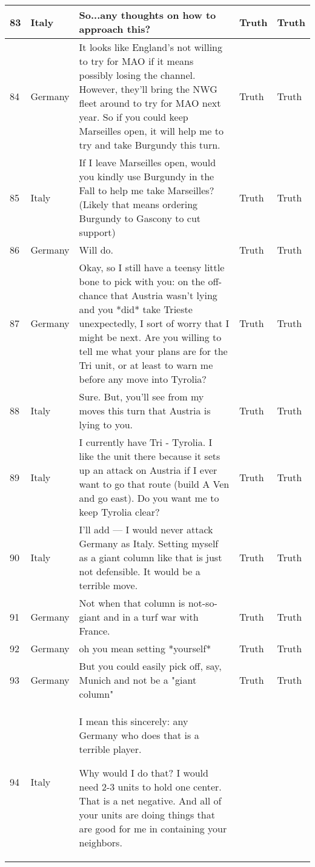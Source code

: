 \begin{longtable}{p{.3 cm} p{1.25cm} p{8.25cm} p{1.1cm} p{1.1cm}}
		\hline
		83 & Italy & So...any thoughts on how to approach this? & Truth & Truth \\
		\hline
		84 & Germany & It looks like England's not willing to try for MAO if it means possibly losing the channel. However, they'll bring the NWG fleet around to try for MAO next year. 
		So if you could keep Marseilles open, it will help me to try and take Burgundy this turn. & Truth & Truth \\
		\hline
		85 & Italy & If I leave Marseilles open, would you kindly use Burgundy in the Fall to help me take Marseilles? (Likely that means ordering Burgundy to Gascony to cut support) & Truth & Truth \\
		\hline
		86 & Germany & Will do. & Truth & Truth \\
		\hline
		87 & Germany & Okay, so I still have a teensy little bone to pick with you: on the off-chance that Austria wasn't lying and you *did* take Trieste unexpectedly, I sort of worry that I might be next. Are you willing to tell me what your plans are for the Tri unit, or at least to warn me before any move into Tyrolia? & Truth & Truth \\
		\hline
		88 & Italy & Sure. But, you'll see from my moves this turn that Austria is lying to you. & Truth & Truth \\
		\hline
		89 & Italy & I currently have Tri - Tyrolia. I like the unit there because it sets up an attack on Austria if I ever want to go that route (build A Ven and go east). Do you want me to keep Tyrolia clear? & Truth & Truth \\
		\hline
		90 & Italy & I'll add --- I would never attack Germany as Italy. Setting myself as a giant column like that is just not defensible. It would be a terrible move. & Truth & Truth \\
		\hline
		91 & Germany & Not when that column is not-so-giant and in a turf war with France. & Truth & Truth \\
		\hline
		92 & Germany & oh you mean setting *yourself* & Truth & Truth \\
		\hline
		93 & Germany & But you could easily pick off, say, Munich and not be a "giant column" & Truth & Truth \\
		\hline
		94 & Italy & I mean this sincerely: any Germany who does that is a terrible player. 
		
		Why would I do that? I would need 2-3 units to hold one center. That is a net negative. And all of your units are doing things that are good for me in containing your neighbors. 
		

\end{longtable}
